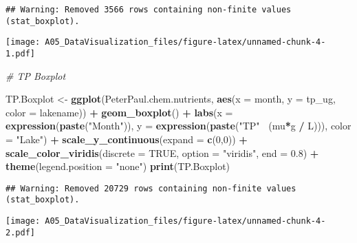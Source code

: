 \documentclass[]{article}
\newenvironment{Shaded}{\begin{snugshade}}{\end{snugshade}}
\newcommand{\KeywordTok}[1]{\textcolor[rgb]{0.13,0.29,0.53}{\textbf{#1}}}
\newcommand{\DataTypeTok}[1]{\textcolor[rgb]{0.13,0.29,0.53}{#1}}
\newcommand{\DecValTok}[1]{\textcolor[rgb]{0.00,0.00,0.81}{#1}}
\newcommand{\FloatTok}[1]{\textcolor[rgb]{0.00,0.00,0.81}{#1}}
\newcommand{\StringTok}[1]{\textcolor[rgb]{0.31,0.60,0.02}{#1}}
\newcommand{\CommentTok}[1]{\textcolor[rgb]{0.56,0.35,0.01}{\textit{#1}}}
\newcommand{\OtherTok}[1]{\textcolor[rgb]{0.56,0.35,0.01}{#1}}
\newcommand{\OperatorTok}[1]{\textcolor[rgb]{0.81,0.36,0.00}{\textbf{#1}}}
\newcommand{\NormalTok}[1]{#1}
\begin{document}
\begin{verbatim}
## Warning: Removed 3566 rows containing non-finite values (stat_boxplot).
\end{verbatim}

\texttt{[image: A05\_DataVisualization\_files/figure-latex/unnamed-chunk-4-1.pdf]}

\begin{Shaded}
\begin{Highlighting}[]
\CommentTok{# TP Boxplot}

\NormalTok{TP.Boxplot <-}\StringTok{ }
\StringTok{  }\KeywordTok{ggplot}\NormalTok{(PeterPaul.chem.nutrients, }\KeywordTok{aes}\NormalTok{(}\DataTypeTok{x =}\NormalTok{ month, }\DataTypeTok{y =}\NormalTok{ tp_ug, }\DataTypeTok{color =}\NormalTok{ lakename)) }\OperatorTok{+}
\StringTok{  }\KeywordTok{geom_boxplot}\NormalTok{() }\OperatorTok{+}
\StringTok{  }\KeywordTok{labs}\NormalTok{(}\DataTypeTok{x =} \KeywordTok{expression}\NormalTok{(}\KeywordTok{paste}\NormalTok{(}\StringTok{"Month"}\NormalTok{)),}
       \DataTypeTok{y =} \KeywordTok{expression}\NormalTok{(}\KeywordTok{paste}\NormalTok{(}\StringTok{"TP"}\OperatorTok{~}\StringTok{ }\NormalTok{(mu}\OperatorTok{*}\NormalTok{g }\OperatorTok{/}\StringTok{ }\NormalTok{L))), }\DataTypeTok{color =} \StringTok{"Lake"}\NormalTok{) }\OperatorTok{+}
\StringTok{  }\KeywordTok{scale_y_continuous}\NormalTok{(}\DataTypeTok{expand =} \KeywordTok{c}\NormalTok{(}\DecValTok{0}\NormalTok{,}\DecValTok{0}\NormalTok{)) }\OperatorTok{+}
\StringTok{  }\KeywordTok{scale_color_viridis}\NormalTok{(}\DataTypeTok{discrete =} \OtherTok{TRUE}\NormalTok{, }\DataTypeTok{option =} \StringTok{"viridis"}\NormalTok{, }\DataTypeTok{end =} \FloatTok{0.8}\NormalTok{) }\OperatorTok{+}
\StringTok{  }\KeywordTok{theme}\NormalTok{(}\DataTypeTok{legend.position =} \StringTok{"none"}\NormalTok{)}
\KeywordTok{print}\NormalTok{(TP.Boxplot)}
\end{Highlighting}
\end{Shaded}

\begin{verbatim}
## Warning: Removed 20729 rows containing non-finite values (stat_boxplot).
\end{verbatim}

\texttt{[image: A05\_DataVisualization\_files/figure-latex/unnamed-chunk-4-2.pdf]}
\end{document}
